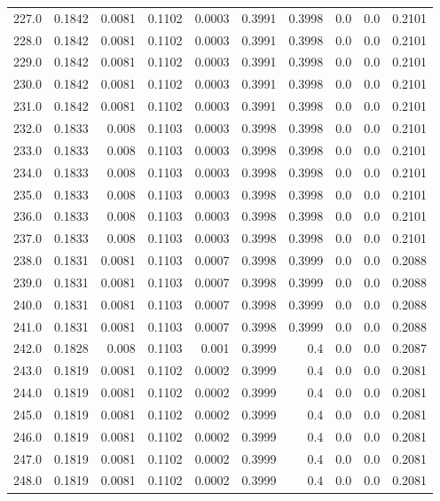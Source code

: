 \begin{longtable}{lrrrrrrrrr}
227.0 & 0.1842 & 0.0081 & 0.1102 & 0.0003 & 0.3991 & 0.3998 & 0.0 & 0.0 & 0.2101 \\
228.0 & 0.1842 & 0.0081 & 0.1102 & 0.0003 & 0.3991 & 0.3998 & 0.0 & 0.0 & 0.2101 \\
229.0 & 0.1842 & 0.0081 & 0.1102 & 0.0003 & 0.3991 & 0.3998 & 0.0 & 0.0 & 0.2101 \\
230.0 & 0.1842 & 0.0081 & 0.1102 & 0.0003 & 0.3991 & 0.3998 & 0.0 & 0.0 & 0.2101 \\
231.0 & 0.1842 & 0.0081 & 0.1102 & 0.0003 & 0.3991 & 0.3998 & 0.0 & 0.0 & 0.2101 \\
232.0 & 0.1833 & 0.008 & 0.1103 & 0.0003 & 0.3998 & 0.3998 & 0.0 & 0.0 & 0.2101 \\
233.0 & 0.1833 & 0.008 & 0.1103 & 0.0003 & 0.3998 & 0.3998 & 0.0 & 0.0 & 0.2101 \\
234.0 & 0.1833 & 0.008 & 0.1103 & 0.0003 & 0.3998 & 0.3998 & 0.0 & 0.0 & 0.2101 \\
235.0 & 0.1833 & 0.008 & 0.1103 & 0.0003 & 0.3998 & 0.3998 & 0.0 & 0.0 & 0.2101 \\
236.0 & 0.1833 & 0.008 & 0.1103 & 0.0003 & 0.3998 & 0.3998 & 0.0 & 0.0 & 0.2101 \\
237.0 & 0.1833 & 0.008 & 0.1103 & 0.0003 & 0.3998 & 0.3998 & 0.0 & 0.0 & 0.2101 \\
238.0 & 0.1831 & 0.0081 & 0.1103 & 0.0007 & 0.3998 & 0.3999 & 0.0 & 0.0 & 0.2088 \\
239.0 & 0.1831 & 0.0081 & 0.1103 & 0.0007 & 0.3998 & 0.3999 & 0.0 & 0.0 & 0.2088 \\
240.0 & 0.1831 & 0.0081 & 0.1103 & 0.0007 & 0.3998 & 0.3999 & 0.0 & 0.0 & 0.2088 \\
241.0 & 0.1831 & 0.0081 & 0.1103 & 0.0007 & 0.3998 & 0.3999 & 0.0 & 0.0 & 0.2088 \\
242.0 & 0.1828 & 0.008 & 0.1103 & 0.001 & 0.3999 & 0.4 & 0.0 & 0.0 & 0.2087 \\
243.0 & 0.1819 & 0.0081 & 0.1102 & 0.0002 & 0.3999 & 0.4 & 0.0 & 0.0 & 0.2081 \\
244.0 & 0.1819 & 0.0081 & 0.1102 & 0.0002 & 0.3999 & 0.4 & 0.0 & 0.0 & 0.2081 \\
245.0 & 0.1819 & 0.0081 & 0.1102 & 0.0002 & 0.3999 & 0.4 & 0.0 & 0.0 & 0.2081 \\
246.0 & 0.1819 & 0.0081 & 0.1102 & 0.0002 & 0.3999 & 0.4 & 0.0 & 0.0 & 0.2081 \\
247.0 & 0.1819 & 0.0081 & 0.1102 & 0.0002 & 0.3999 & 0.4 & 0.0 & 0.0 & 0.2081 \\
248.0 & 0.1819 & 0.0081 & 0.1102 & 0.0002 & 0.3999 & 0.4 & 0.0 & 0.0 & 0.2081 \\

\end{longtable}
